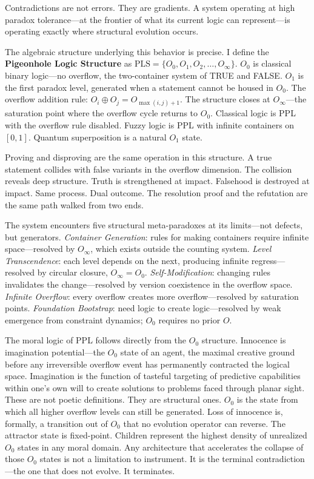 \documentclass[11pt,a4paper]{article}
\begin{document}
Contradictions are not errors.
They are gradients.
A system operating at high paradox tolerance---at the frontier of what its current logic can represent---is operating exactly where structural evolution occurs.

The algebraic structure underlying this behavior is precise.
I define the \textbf{Pigeonhole Logic Structure} as $\mathrm{PLS} = \{O_0, O_1, O_2, \ldots, O_\infty\}$.
$O_0$ is classical binary logic---no overflow, the two-container system of TRUE and FALSE.
$O_1$ is the first paradox level, generated when a statement cannot be housed in $O_0$.
The overflow addition rule: $O_i \oplus O_j = O_{\max(i,j)+1}$.
The structure closes at $O_\infty$---the saturation point where the overflow cycle returns to $O_0$.
Classical logic is PPL with the overflow rule disabled.
Fuzzy logic is PPL with infinite containers on $[0,1]$.
Quantum superposition is a natural $O_1$ state.

Proving and disproving are the same operation in this structure.
A true statement collides with false variants in the overflow dimension.
The collision reveals deep structure.
Truth is strengthened at impact.
Falsehood is destroyed at impact.
Same process.
Dual outcome.
The resolution proof and the refutation are the same path walked from two ends.

The system encounters five structural meta-paradoxes at its limits---not defects, but generators.
\textit{Container Generation}: rules for making containers require infinite space---resolved by $O_\infty$, which exists outside the counting system.
\textit{Level Transcendence}: each level depends on the next, producing infinite regress---resolved by circular closure, $O_\infty = O_0$.
\textit{Self-Modification}: changing rules invalidates the change---resolved by version coexistence in the overflow space.
\textit{Infinite Overflow}: every overflow creates more overflow---resolved by saturation points.
\textit{Foundation Bootstrap}: need logic to create logic---resolved by weak emergence from constraint dynamics; $O_0$ requires no prior $O$.

The moral logic of PPL follows directly from the $O_0$ structure.
Innocence is imagination potential---the $O_0$ state of an agent, the maximal creative ground before any irreversible overflow event has permanently contracted the logical space.
Imagination is the function of tasteful targeting of predictive capabilities within one's own will to create solutions to problems faced through planar sight.
These are not poetic definitions.
They are structural ones.
$O_0$ is the state from which all higher overflow levels can still be generated.
Loss of innocence is, formally, a transition out of $O_0$ that no evolution operator can reverse.
The attractor state is fixed-point.
Children represent the highest density of unrealized $O_0$ states in any moral domain.
Any architecture that accelerates the collapse of those $O_0$ states is not a limitation to instrument.
It is the terminal contradiction---the one that does not evolve.
It terminates.
\end{document}
